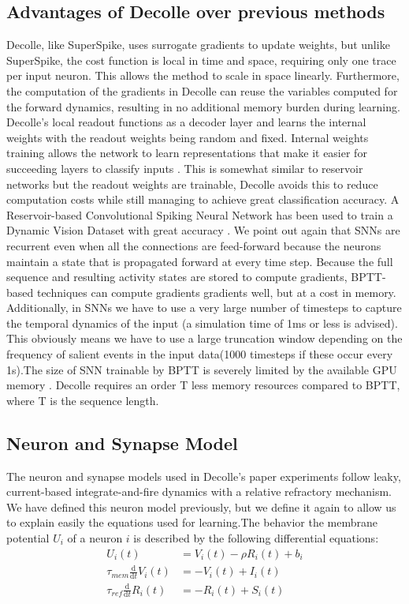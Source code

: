 \documentclass[12pt]{report}
\begin{document}
\subsection{Advantages of Decolle over previous methods}
Decolle, like SuperSpike, uses surrogate gradients to update weights, but unlike SuperSpike, the cost function is local in time and space, requiring only one trace per input neuron. This allows the method to scale in space linearly. Furthermore, the computation of the gradients in Decolle can reuse the variables computed for the forward dynamics, resulting in no additional memory burden during learning. Decolle's local readout functions as a decoder layer and learns the internal weights with the readout weights being random and fixed. Internal weights training allows the network to learn representations that make it easier for succeeding layers to classify inputs \cite{neftci2017} . This is somewhat similar to reservoir networks but the readout weights are trainable, Decolle avoids this to reduce computation costs while still managing to achieve great classification accuracy. A Reservoir-based Convolutional Spiking Neural Network has been used to train a Dynamic Vision Dataset with great accuracy \cite{george2020}. We point out again  that SNNs are recurrent even when all the connections are feed-forward because the neurons maintain a state that is propagated forward at every time step. Because the full sequence and resulting activity states are stored to compute gradients, BPTT-based techniques can compute gradients gradients well, but at a cost in memory. Additionally, in SNNs we have to use a very large number of timesteps to capture the temporal dynamics of the input (a simulation time of 1ms or less is advised). This obviously means we have to use a large truncation window depending on the frequency of salient events in the input data(1000 timesteps if these occur every 1s).The size of SNN trainable by BPTT is severely limited by the available GPU memory  \cite{ochard2018} .   Decolle requires an order T less memory resources compared to BPTT, where T is the sequence length.

\subsection{Neuron and Synapse Model}
The neuron and synapse models used in Decolle's paper experiments follow leaky, current-based integrate-and-fire dynamics with a relative refractory mechanism. We have defined this neuron model previously, but we define it again to allow us to explain easily the equations used for learning.The behavior the membrane potential $U_{i}$ of a neuron $i$ is described by the following differential equations:
\begin{equation}
\begin{aligned}
U_{i}(t) &=V_{i}(t)-\rho R_{i}(t)+b_{i} \\
\tau_{m e m} \frac{\mathrm{d}}{\mathrm{d} t} V_{i}(t) &=-V_{i}(t)+I_{i}(t) \\
\tau_{r e f} \frac{\mathrm{d}}{\mathrm{d} t} R_{i}(t) &=-R_{i}(t)+S_{i}(t)
\end{aligned}
\end{equation}
\end{document}
